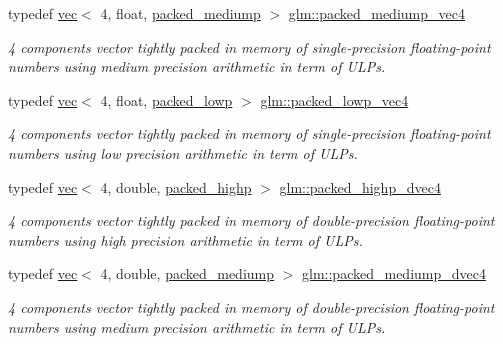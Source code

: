 \begin{DoxyCompactItemize}
typedef \mbox{\hyperlink{structglm_1_1vec}{vec}}$<$ 4, float, \mbox{\hyperlink{namespaceglm_a36ed105b07c7746804d7fdc7cc90ff25a9604654c3b137cd7898689fd34b25bc0}{packed\+\_\+mediump}} $>$ \mbox{\hyperlink{group__gtc__type__aligned_ga18f1166b7888d6e0d7d659f5a022e6ea}{glm\+::packed\+\_\+mediump\+\_\+vec4}}
\begin{DoxyCompactList}\small\item\em 4 components vector tightly packed in memory of single-\/precision floating-\/point numbers using medium precision arithmetic in term of U\+L\+Ps. \end{DoxyCompactList}\item 
typedef \mbox{\hyperlink{structglm_1_1vec}{vec}}$<$ 4, float, \mbox{\hyperlink{namespaceglm_a36ed105b07c7746804d7fdc7cc90ff25ac36a4bd74559be2c0b65bc48e5953b8b}{packed\+\_\+lowp}} $>$ \mbox{\hyperlink{group__gtc__type__aligned_ga35756405558e0f3cd7d194f07d557276}{glm\+::packed\+\_\+lowp\+\_\+vec4}}
\begin{DoxyCompactList}\small\item\em 4 components vector tightly packed in memory of single-\/precision floating-\/point numbers using low precision arithmetic in term of U\+L\+Ps. \end{DoxyCompactList}\item 
typedef \mbox{\hyperlink{structglm_1_1vec}{vec}}$<$ 4, double, \mbox{\hyperlink{namespaceglm_a36ed105b07c7746804d7fdc7cc90ff25a8e8791ee77fe079b1291f710d88031bf}{packed\+\_\+highp}} $>$ \mbox{\hyperlink{group__gtc__type__aligned_ga7eb6a2440202876a3a223a1931dd496a}{glm\+::packed\+\_\+highp\+\_\+dvec4}}
\begin{DoxyCompactList}\small\item\em 4 components vector tightly packed in memory of double-\/precision floating-\/point numbers using high precision arithmetic in term of U\+L\+Ps. \end{DoxyCompactList}\item 
typedef \mbox{\hyperlink{structglm_1_1vec}{vec}}$<$ 4, double, \mbox{\hyperlink{namespaceglm_a36ed105b07c7746804d7fdc7cc90ff25a9604654c3b137cd7898689fd34b25bc0}{packed\+\_\+mediump}} $>$ \mbox{\hyperlink{group__gtc__type__aligned_gaa88ce743e1248a4e822e591e6bdf071b}{glm\+::packed\+\_\+mediump\+\_\+dvec4}}
\begin{DoxyCompactList}\small\item\em 4 components vector tightly packed in memory of double-\/precision floating-\/point numbers using medium precision arithmetic in term of U\+L\+Ps. \end{DoxyCompactList}\item 

\end{DoxyCompactItemize}
